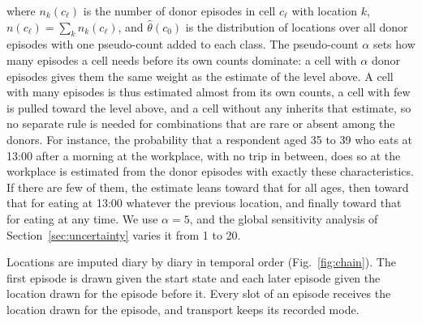 \documentclass[a4paper]{article}
\begin{document}
where $n_k(c_\ell)$ is the number of donor episodes in cell $c_\ell$ with location $k$, $n(c_\ell) = \sum_k n_k(c_\ell)$, and $\hat\theta(c_0)$ is the distribution of locations over all donor episodes with one pseudo-count added to each class. The pseudo-count $\alpha$ sets how many episodes a cell needs before its own counts dominate: a cell with $\alpha$ donor episodes gives them the same weight as the estimate of the level above. A cell with many episodes is thus estimated almost from its own counts, a cell with few is pulled toward the level above, and a cell without any inherits that estimate, so no separate rule is needed for combinations that are rare or absent among the donors. For instance, the probability that a respondent aged 35 to 39 who eats at 13:00 after a morning at the workplace, with no trip in between, does so at the workplace is estimated from the donor episodes with exactly these characteristics. If there are few of them, the estimate leans toward that for all ages, then toward that for eating at 13:00 whatever the previous location, and finally toward that for eating at any time. We use $\alpha = 5$, and the global sensitivity analysis of Section~\ref{sec:uncertainty} varies it from 1 to 20.

Locations are imputed diary by diary in temporal order (Fig.~\ref{fig:chain}). The first episode is drawn given the start state and each later episode given the location drawn for the episode before it. Every slot of an episode receives the location drawn for the episode, and transport keeps its recorded mode.
\end{document}
